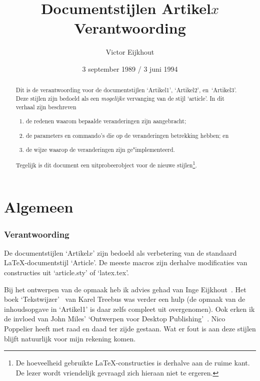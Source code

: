\documentclass[a4paper]{artikel1} %
\begin{document}
\date{3 september 1989 / 3 juni 1994}
\title{Documentstijlen Artikel$x$\\
  Verantwoording}
\author{Victor Eijkhout}
\maketitle
 
\begin{abstract}
  Dit is de verantwoording voor de documentstijlen `Artikel1',
  `Artikel2', en~`Artikel3'.  Deze stijlen zijn bedoeld als een
  \emph{mogelijke} vervanging van de stijl `article'. In dit verhaal
  zijn beschreven
\begin{enumerate}
\item de redenen waarom bepaalde veranderingen zijn aangebracht;
\item de parameters en commando's die op de veranderingen betrekking
  hebben; en
\item de wijze waarop de veranderingen zijn ge"implementeerd.
\end{enumerate}
Tegelijk is dit document een uitprobeerobject voor de nieuwe
stijlen\footnote{De hoeveelheid gebruikte \LaTeX-constructies is
  derhalve aan de ruime kant. De lezer wordt vriendelijk gevraagd zich
  hieraan niet te ergeren.}.
\end{abstract}
 
 
\part{Algemeen}
 
\section{Verantwoording}
 
De documentstijlen `Artikel$x$' zijn bedoeld als verbetering van de
standaard \LaTeX-document\-stijl `Article'. De meeste macros zijn
derhalve modificaties van constructies uit `article.sty' of
`latex.tex'.
 
Bij het ontwerpen van de opmaak heb ik advies gehad van Inge
Eijkhout~\cite{Inge}.  Het boek `Tekstwijzer'~\cite{Karel} van Karel
Treebus was verder een hulp (de opmaak van de inhoudsopgave in
`Artikel1' is daar zelfs compleet uit overgenomen).  Ook erken ik de
invloed van John Miles' `Ontwerpen voor Desktop
Publishing'~\cite{Miles}.  Nico Poppelier heeft met raad en daad ter
zijde gestaan.  Wat er fout is aan deze stijlen blijft natuurlijk voor
mijn rekening komen.
 
\end{document}
